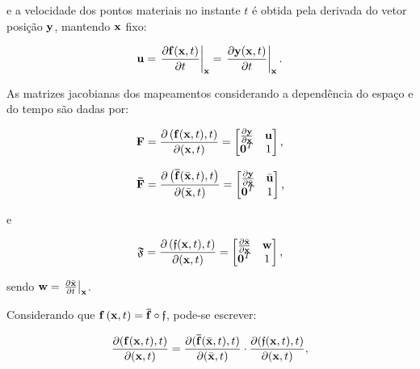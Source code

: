 \documentclass[tese_patricia]{subfiles}%
\begin{document}
\noindent e a velocidade dos pontos materiais no instante $t$ é obtida pela derivada do vetor posição $\mathbf{y}$, mantendo $\mathbf{x}$ fixo:

\begin{align}
	\mathbf{u} = \left. \frac{\partial \mathbf{f}(\mathbf{x},t)}{\partial t} \right|_{\mathbf{x}} = \left. \frac{\partial \mathbf{y}(\mathbf{x},t)}{\partial t} \right|_{\mathbf{x}}.
\end{align}


As matrizes jacobianas dos mapeamentos considerando a dependência do espaço e do tempo são dadas por:

\begin{equation} 
	\mathbf{F} = \frac{\partial \left(\mathbf{f}(\mathbf{x},t),t\right)}{\partial (\mathbf{x},t)}=
	\begin{bmatrix}
		\frac{\partial {\mathbf{y}}}{\partial {\mathbf{x}}} & \mathbf{u} \\
		\mathbf{0}^T & 1 \\
	\end{bmatrix}
	\text{,}
\end{equation}

\begin{equation} 
	\mathbf{\bar{F}} = \frac{\partial \left(\mathbf{\bar{f}}(\bar{\mathbf{x}},t),t\right)}{\partial (\bar{\mathbf{x}},t)}=
	\begin{bmatrix}
		\frac{\partial {\mathbf{y}}}{\partial {\bar{\mathbf{x}}}} & \bar{\mathbf{u}} \\
		\mathbf{0}^T & 1 \\
	\end{bmatrix}
	\text{,}
\end{equation}

e

\begin{equation}
	\mathfrak{F} = \frac{\partial \left({\mathfrak{f}}(\mathbf{x},t),t\right)}{\partial (\mathbf{x},t)}=
	\begin{bmatrix}
		\frac{\partial {\bar{\mathbf{x}}}}{\partial {\mathbf{x}}} & \mathbf{w} \\
		\mathbf{0}^T & 1 \\
	\end{bmatrix}
	\text{,}
\end{equation}

\noindent sendo $\mathbf{w} = \left. \frac{\partial \bar{\mathbf{x}}}{\partial t} \right|_{\mathbf{x}}$.


Considerando que $\mathbf{f}\left(\mathbf{x},t\right) = \mathbf{\bar{f}} \circ \mathfrak{f}$, pode-se escrever:

\begin{align}
	\frac{\partial(\mathbf{f}(\mathbf{x},t),t)}{\partial(\mathbf{x},t)} = \frac{\partial(\mathbf{\bar{f}}(\bar{\mathbf{x}},t),t)}{\partial(\bar{\mathbf{x}},t)} \cdot \frac{\partial(\mathfrak{f}(\mathbf{x},t),t)}{\partial(\mathbf{x},t)},
\end{align}
\end{document}
